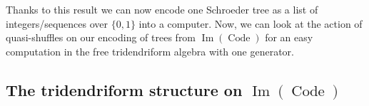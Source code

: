 \documentclass[a4paper,10pt]{amsart}
\DeclareMathOperator{\ima}{Im}
\DeclareMathOperator{\IC}{InitChain}
\DeclareMathOperator{\Code}{Code}
\DeclareMathOperator{\Con}{Con}
\newcommand\NN{\mathbb{N}}
\newcommand{\IEM}[2]{\llbracket #1,#2 \rrbracket}
\newcommand{\Schw}{Schroeder} %
\newtheorem{prop}{Proposition}
\theoremstyle{definition}
\newtheorem{defi}{Definition}
\newtheorem{Rq}{Remark}
\newcommand{\PCt}[1]{{\color{blue} \texttt{#1}}}
\begin{document}
Thanks to this result we can now encode one \Schw{} tree as a list of integers/sequences over $\{0,1\}$ into a computer. Now, we can look at the action of quasi-shuffles on our encoding of trees from $\ima(\Code)$ for an easy computation in the free tridendriform algebra with one generator.

%
%
% 

\subsection{The tridendriform structure on $\ima(\Code)$}
\end{document}
